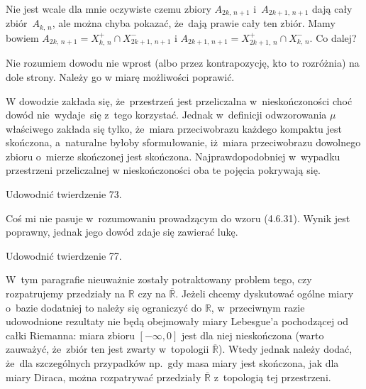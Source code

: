 \documentclass[a4paper,11pt]{article}
\begin{document}
\start {} Nie jest wcale dla mnie oczywiste czemu zbiory
$A_{ 2 k,\, n+ 1 }$ i~$A_{ 2 k + 1,\, n+ 1 }$ dają cały
zbiór~$A_{ k,\, n }$, ale można chyba pokazać, że~dają prawie cały ten
zbiór. Mamy bowiem
$A_{ 2 k,\, n + 1 } = X^{ + }_{ k,\, n } \cap X^{ - }_{ 2 k + 1,\, n +
  1 }$ i
$A_{ 2 k + 1,\, n + 1 } = X^{ + }_{ 2 k + 1,\, n } \cap X^{ - }_{ k,\,
  n }$. Co dalej?

\vspace{\spaceFour}


\start {} Nie rozumiem dowodu nie wprost (albo przez
kontrapozycję, kto to rozróżnia) na dole strony. Należy go w miarę
możliwości poprawić.

\vspace{\spaceFour}

  
\start {} W dowodzie zakłada się, że~przestrzeń jest
przeliczalna w~nieskończoności choć dowód nie~wydaje~się z~tego
korzystać. Jednak w~definicji odwzorowania $\mu$\dywiz właściwego
zakłada się tylko, że~miara przeciwobrazu każdego kompaktu jest
skończona, a~naturalne byłoby sformułowanie, iż~miara przeciwobrazu
dowolnego zbioru o~mierze skończonej jest skończona.
Najprawdopodobniej w~wypadku przestrzeni przeliczalnej w
nieskończoności oba te pojęcia pokrywają się.

\vspace{\spaceFour}

  
\start {} Udowodnić twierdzenie 73.

\vspace{\spaceFour}


\start {} Coś mi nie pasuje w~rozumowaniu prowadzącym do wzoru
(4.6.31). Wynik jest poprawny, jednak jego dowód zdaje się zawierać
lukę.

\vspace{\spaceFour}

  
\start {} Udowodnić twierdzenie 77.

\vspace{\spaceFour}


\start {} W~tym paragrafie nieuważnie zostały potraktowany
problem tego, czy rozpatrujemy przedziały na $\mathbb{R}$ czy na
$\overline{\mathbb{R}}$. Jeżeli chcemy dyskutować ogólne miary o~bazie
dodatniej to należy się ograniczyć do $\mathbb{R}$, w~przeciwnym razie
udowodnione rezultaty nie będą obejmowały miary Lebesgue'a pochodzącej
od całki Riemanna: miara zbioru $[-\infty, 0]$ jest dla niej
nieskończona (warto zauważyć, że~zbiór ten jest zwarty w~topologii
$\overline{\mathbb{R}}$). Wtedy jednak należy dodać, że~dla
szczególnych przypadków np.~gdy masa miary jest skończona, jak dla
miary Diraca, można rozpatrywać przedziały $\overline{\mathbb{R}}$
z~topologią tej przestrzeni.
\end{document}
